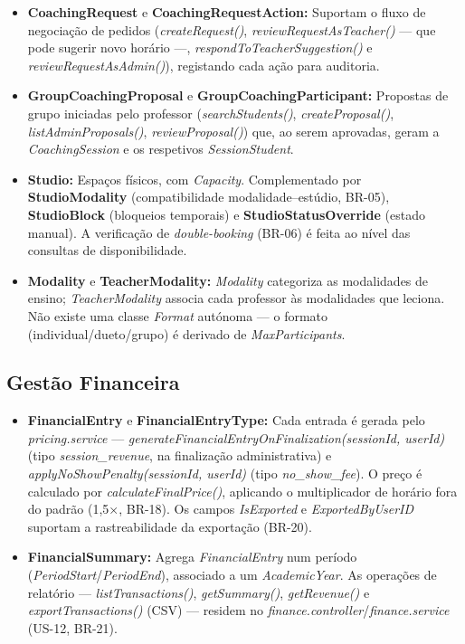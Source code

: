 \documentclass[12pt,a4paper]{report}
\begin{document}
\begin{itemize}
    \item \textbf{CoachingRequest} e \textbf{CoachingRequestAction:} Suportam o
    fluxo de negociação de pedidos (\textit{createRequest()},
    \textit{reviewRequestAsTeacher()} --- que pode sugerir novo horário ---,
    \textit{respondToTeacherSuggestion()} e \textit{reviewRequestAsAdmin()}),
    registando cada ação para auditoria.

    \item \textbf{GroupCoachingProposal} e \textbf{GroupCoachingParticipant:}
    Propostas de grupo iniciadas pelo professor (\textit{searchStudents()},
    \textit{createProposal()}, \textit{listAdminProposals()},
    \textit{reviewProposal()}) que, ao serem aprovadas, geram a
    \textit{CoachingSession} e os respetivos \textit{SessionStudent}.

    \item \textbf{Studio:} Espaços físicos, com \textit{Capacity}. Complementado por
    \textbf{StudioModality} (compatibilidade modalidade--estúdio, BR-05),
    \textbf{StudioBlock} (bloqueios temporais) e \textbf{StudioStatusOverride}
    (estado manual). A verificação de \textit{double-booking} (BR-06) é feita ao
    nível das consultas de disponibilidade.

    \item \textbf{Modality} e \textbf{TeacherModality:} \textit{Modality} categoriza
    as modalidades de ensino; \textit{TeacherModality} associa cada professor às
    modalidades que leciona. Não existe uma classe \textit{Format} autónoma --- o
    formato (individual/dueto/grupo) é derivado de \textit{MaxParticipants}.
\end{itemize}

\subsection{Gestão Financeira}
\begin{itemize}
    \item \textbf{FinancialEntry} e \textbf{FinancialEntryType:} Cada entrada é
    gerada pelo \textit{pricing.service} ---
    \textit{generateFinancialEntryOnFinalization(sessionId, userId)} (tipo
    \textit{session\_revenue}, na finalização administrativa) e
    \textit{applyNoShowPenalty(sessionId, userId)} (tipo \textit{no\_show\_fee}). O
    preço é calculado por \textit{calculateFinalPrice()}, aplicando o multiplicador
    de horário fora do padrão (1,5×, BR-18). Os campos \textit{IsExported} e
    \textit{ExportedByUserID} suportam a rastreabilidade da exportação (BR-20).

    \item \textbf{FinancialSummary:} Agrega \textit{FinancialEntry} num período
    (\textit{PeriodStart}/\textit{PeriodEnd}), associado a um \textit{AcademicYear}.
    As operações de relatório --- \textit{listTransactions()}, \textit{getSummary()},
    \textit{getRevenue()} e \textit{exportTransactions()} (CSV) --- residem no
    \textit{finance.controller}/\textit{finance.service} (US-12, BR-21).
\end{itemize}
\end{document}
